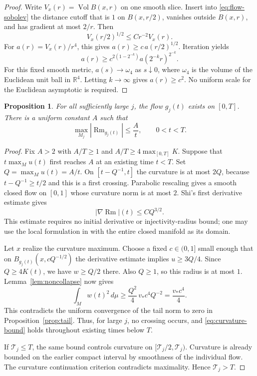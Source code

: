 \documentclass[11pt]{article}
\newtheorem{proposition}[theorem]{Proposition}
\theoremstyle{definition}
\theoremstyle{remark}
\numberwithin{equation}{section}
\DeclareMathOperator{\Rm}{Rm}
\DeclareMathOperator{\Vol}{Vol}
\newcommand{\dd}{\,d\mu}
\newcommand{\R}{\mathbb R}
\begin{document}
\begin{proof}
Write $V_x(r)=\Vol B(x,r)$ on one smooth slice. Insert into
\eqref{eq:flow-sobolev} the distance cutoff that is $1$ on $B(x,r/2)$,
vanishes outside $B(x,r)$, and has gradient at most $2/r$. Then
\[
 V_x(r/2)^{1/2}\le Cr^{-2}V_x(r).
\]
For $a(r)=V_x(r)/r^4$, this gives $a(r)\ge c\,a(r/2)^{1/2}$.
Iteration yields
\[
 a(r)\ge c^{2(1-2^{-k})}a(2^{-k}r)^{2^{-k}}.
\]
For this fixed smooth metric, $a(s)\to\omega_4$ as $s\downarrow0$,
where $\omega_4$ is the volume of the Euclidean unit ball in $\R^4$.
Letting $k\to\infty$ gives $a(r)\ge c^2$. No uniform scale for the
Euclidean asymptotic is required.
\end{proof}

\begin{proposition}\label{prop:smoothing}
For all sufficiently large $j$, the flow $g_j(t)$ exists on $[0,T]$.
There is a uniform constant $A$ such that
\begin{equation}\label{eq:curvature-bound}
 \max_{M_j}|\Rm_{g_j(t)}|\le\frac At,
 \qquad 0<t<T.
\end{equation}
\end{proposition}

\begin{proof}
Fix $A>2$ with $A/T\ge1$ and $A/T\ge4\max_{[0,T]}K$.
Suppose that $t\max_Mu(t)$ first reaches $A$ at an existing time $t<T$.
Set $Q=\max_Mu(t)=A/t$. On $[t-Q^{-1},t]$ the curvature is at most
$2Q$, because $t-Q^{-1}\ge t/2$ and this is a first crossing.
Parabolic rescaling gives a smooth closed flow on $[0,1]$ whose
curvature norm is at most $2$. Shi's first derivative estimate
\cite{Shi} gives
\[
 |\nabla\Rm|(t)\le CQ^{3/2}.
\]
This estimate requires no initial derivative or injectivity-radius
bound; one may use the local formulation in
\cite[Theorem~3.27]{MorganTian} with the entire closed manifold as its
domain.

Let $x$ realize the curvature maximum. Choose a fixed $c\in(0,1]$
small enough that on $B_{g_j(t)}(x,cQ^{-1/2})$ the derivative estimate
implies $u\ge3Q/4$. Since $Q\ge4K(t)$, we have $w\ge Q/2$ there.
Also $Q\ge1$, so this radius is at most $1$. Lemma~\ref{lem:noncollapse}
now gives
\[
 \int_Mw(t)^2\dd\ge\frac{Q^2}{4}\,v_*c^4Q^{-2}
 =\frac{v_*c^4}{4}.
\]
This contradicts the uniform convergence of the tail norm to zero in
Proposition~\ref{prop:tail}. Thus, for large $j$, no crossing occurs,
and \eqref{eq:curvature-bound} holds throughout existing times below $T$.

If $\mathcal T_j\le T$, the same bound controls curvature on
$[\mathcal T_j/2,\mathcal T_j)$. Curvature is already bounded on the
earlier compact interval by smoothness of the individual flow. The
curvature continuation criterion contradicts maximality. Hence
$\mathcal T_j>T$.
\end{proof}
\end{document}
